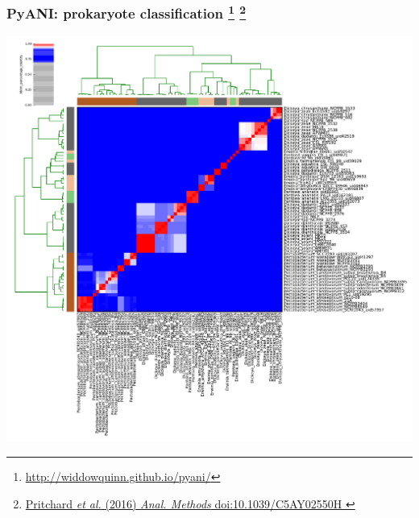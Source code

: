 \begin{frame}
  \frametitle{PyANI: prokaryote classification
  \footnote{\tiny{\href{http://widdowquinn.github.io/pyani/}{http://widdowquinn.github.io/pyani/}}}
  \footnote{\tiny{\href{http://dx.doi.org/10.1039/C5AY02550H
}{Pritchard \textit{et al.} (2016) \textit{Anal. Methods} doi:10.1039/C5AY02550H
}}}  
  }
  \begin{center}
    \includegraphics[height=0.75\textheight]{images/figure_anim_pid_SRE}
  \end{center}
\end{frame}